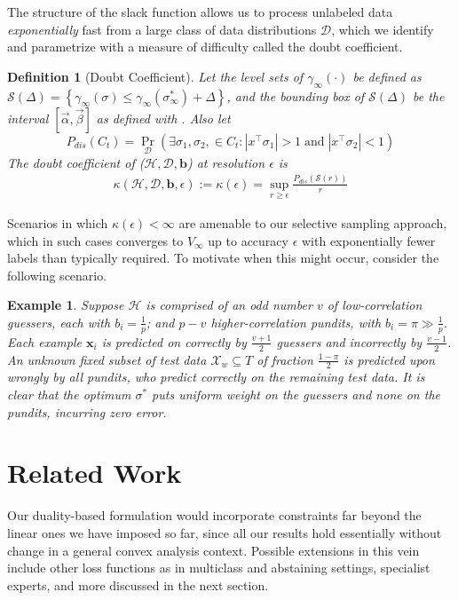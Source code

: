 \documentclass{colt2015} %
\newtheorem{defn}[thm]{Definition}
\newtheorem{examp}{Example}
\newcommand{\vx}{\mathbf{x}}
\newcommand{\vb}{\mathbf{b}}
\newcommand{\valpha}{\vec{\alpha}}
\newcommand{\vbeta}{\vec{\beta}}
\DeclareMathOperator{\Prtxt}{Pr}
\newcommand{\abs}[1]{\left| #1 \right|}
\newcommand{\prp}[2]{\Prtxt_{#2} \left(#1\right)}
\newcommand{\cH}{\mathcal{H}}
\newcommand{\cX}{\mathcal{X}}
\newcommand{\cD}{\mathcal{D}}
\newcommand{\cS}{\mathcal{S}}
\newcommand{\pdis}[1]{P_{dis}\left(#1\right)}
\newcommand{\lrsetb}[1]{\left\{#1\right\}}
\renewcommand{\comment}[3]{\marginpar{\textcolor{#2}{#1: #3}}}
\newcommand{\akshay}[1]{\comment{Akshay}{orange}{#1}}
\begin{document}
The structure of the slack function allows us 
to process unlabeled data \emph{exponentially} fast 
from a large class of data distributions $\cD$, 
which we identify and parametrize with a measure of difficulty called the doubt coefficient. 

\begin{defn}[Doubt Coefficient]
Let the level sets of $\gamma_{\infty} (\cdot)$ be defined as 
$\cS (\Delta) = \lrsetb{ \gamma_{\infty} (\sigma) \leq \gamma_{\infty} (\sigma_{\infty}^*) + \Delta}$, 
and the bounding box of $\cS (\Delta)$ be the interval $[\valpha, \vbeta]$ as defined 
with . 
Also let 
$$\pdis{C_t} = \prp{\exists \sigma_1, \sigma_2, \in C_t : \abs{x^\top \sigma_1} > 1 \;\text{and}\; \abs{x^\top \sigma_2} < 1 }{\cD}$$
The \emph{doubt coefficient} of ($\cH, \cD, \vb$) at resolution $\epsilon$ is 
\begin{align*}
\kappa (\cH, \cD, \vb, \epsilon) := \kappa (\epsilon) = \sup_{r \geq \epsilon} \frac{\pdis{\cS (r)}}{r}
\end{align*}
\end{defn}

\akshay{Finished highlighting naive algorithm in previous subsection. 
Now am writing the definitions and example in this section, though I still need to work out that the example fits the doubt coeff. condition.}

Scenarios in which $\kappa (\epsilon) < \infty$ are amenable to our selective sampling approach, 
which in such cases converges to $V_{\infty}$ up to accuracy $\epsilon$ with exponentially fewer labels than typically required. 
To motivate when this might occur, 
consider the following scenario. 

\begin{examp}
\normalfont
Suppose $\cH$ is comprised of an odd number $v$ of low-correlation \emph{guessers}, each with $b_i = \frac{1}{p}$;  
and $p - v$ higher-correlation \emph{pundits}, with $b_i = \pi \gg \frac{1}{p}$. 
Each example $\vx_i$ is predicted on correctly by $\frac{v+1}{2}$ guessers and incorrectly by $\frac{v-1}{2}$. 
An unknown fixed subset of test data $\cX_w \subseteq T$ of fraction $\frac{1- \pi}{2}$ is predicted upon wrongly by all pundits, 
who predict correctly on the remaining test data.
It is clear that the optimum $\sigma^*$ puts uniform weight on the guessers and none on the pundits, 
incurring zero error.  
\end{examp}

\fi


\section{Related Work}
\label{sec:relwork}
Our duality-based formulation would incorporate constraints far beyond the linear ones we have imposed so far, 
since all our results hold essentially without change in a general convex analysis context. 
Possible extensions in this vein include other loss functions as in multiclass and abstaining settings, specialist experts, 
and more discussed in the next section.
\end{document}
